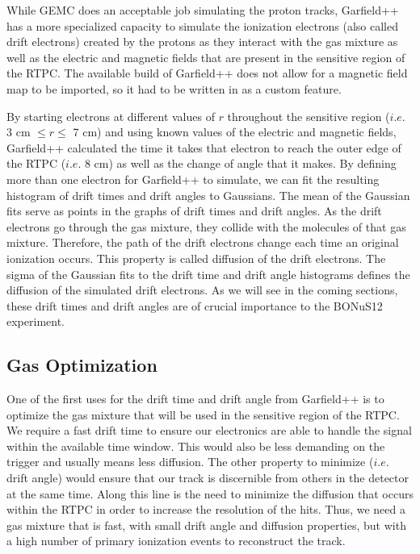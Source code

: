 While GEMC does an acceptable job simulating the proton tracks, Garfield++ has a more specialized capacity to simulate the ionization electrons (also called drift electrons) created by the protons as they interact with the gas mixture as well as the electric and magnetic fields that are present in the sensitive region of the RTPC. The available build of Garfield++ does not allow for a magnetic field map to be imported, so it had to be written in as a custom feature. 

By starting electrons at different values of $r$ throughout the sensitive region ($i.e.$ 3 cm $\leq r \leq$ 7 cm) and using known values of the electric and magnetic fields, Garfield++ calculated the time it takes that electron to reach the outer edge of the RTPC ($i.e.$ 8 cm) as well as the change of angle that it makes. By defining more than one electron for Garfield++ to simulate, we can fit the resulting histogram of drift times and drift angles to Gaussians. The mean of the Gaussian fits serve as points in the graphs of drift times and drift angles. As the drift electrons go through the gas mixture, they collide with the molecules of that gas mixture. Therefore, the path of the drift electrons change each time an original ionization occurs.\cite{book:drift_electrons} This property is called diffusion of the drift electrons. The sigma of the Gaussian fits to the drift time and drift angle histograms defines the diffusion of the simulated drift electrons. As we will see in the coming sections, these drift times and drift angles are of crucial importance to the BONuS12 experiment. 

\subsection{Gas Optimization}
\label{sec:gas_opt}
One of the first uses for the drift time and drift angle from Garfield++ is to optimize the gas mixture that will be used in the sensitive region of the RTPC. We require a fast drift time to ensure our electronics are able to handle the signal within the available time window. This would also be less demanding on the trigger and usually means less diffusion. The other property to minimize ($i.e.$ drift angle) would ensure that our track is discernible from others in the detector at the same time. Along this line is the need to minimize the diffusion that occurs within the RTPC in order to increase the resolution of the hits. Thus, we need a gas mixture that is fast, with small drift angle and diffusion properties, but with a high number of primary ionization events to reconstruct the track.

